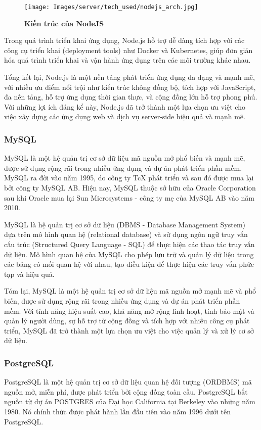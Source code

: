 \begin{figure}[H]
  \centering
  \texttt{[image: Images/server/tech\_used/nodejs\_arch.jpg]}
  \caption[Kiến trúc của NodeJS]{\bfseries \fontsize{12pt}{0pt}
  \selectfont Kiến trúc của NodeJS}
  \label{ble_services} %
\end{figure}
Trong quá trình triển khai ứng dụng, Node.js hỗ trợ dễ dàng tích hợp với các công cụ triển khai (deployment tools) như Docker và Kubernetes, giúp đơn giản hóa quá trình triển khai và vận hành ứng dụng trên các môi trường khác nhau.

Tổng kết lại, Node.js là một nền tảng phát triển ứng dụng đa dạng và mạnh mẽ, với nhiều ưu điểm nổi trội như kiến trúc không đồng bộ, tích hợp với JavaScript, đa nền tảng, hỗ trợ ứng dụng thời gian thực, và cộng đồng lớn hỗ trợ phong phú. Với những lợi ích đáng kể này, Node.js đã trở thành một lựa chọn ưu việt cho việc xây dựng các ứng dụng web và dịch vụ server-side hiệu quả và mạnh mẽ.

\subsubsection{MySQL}
\mbox{}

MySQL là một hệ quản trị cơ sở dữ liệu mã nguồn mở phổ biến và mạnh mẽ, được sử dụng rộng rãi trong nhiều ứng dụng và dự án phát triển phần mềm. MySQL ra đời vào năm 1995, do công ty TcX phát triển và sau đó được mua lại bởi công ty MySQL AB. Hiện nay, MySQL thuộc sở hữu của Oracle Corporation sau khi Oracle mua lại Sun Microsystems - công ty mẹ của MySQL AB vào năm 2010. \cite{mysql_1}

MySQL là hệ quản trị cơ sở dữ liệu (DBMS - Database Management System) dựa trên mô hình quan hệ (relational database) và sử dụng ngôn ngữ truy vấn cấu trúc (Structured Query Language - SQL) để thực hiện các thao tác truy vấn dữ liệu. Mô hình quan hệ của MySQL cho phép lưu trữ và quản lý dữ liệu trong các bảng có mối quan hệ với nhau, tạo điều kiện để thực hiện các truy vấn phức tạp và hiệu quả. \cite{myql_2}

Tóm lại, MySQL là một hệ quản trị cơ sở dữ liệu mã nguồn mở mạnh mẽ và phổ biến, được sử dụng rộng rãi trong nhiều ứng dụng và dự án phát triển phần mềm. Với tính năng hiệu suất cao, khả năng mở rộng linh hoạt, tính bảo mật và quản lý người dùng, sự hỗ trợ từ cộng đồng và tích hợp với nhiều công cụ phát triển, MySQL đã trở thành một lựa chọn ưu việt cho việc quản lý và xử lý cơ sở dữ liệu.

\subsubsection{PostgreSQL}
\mbox{}
PostgreSQL là một hệ quản trị cơ sở dữ liệu quan hệ đối tượng (ORDBMS) mã nguồn mở, miễn phí, được phát triển bởi cộng đồng toàn cầu. PostgreSQL bắt nguồn từ dự án POSTGRES của Đại học California tại Berkeley vào những năm 1980. Nó chính thức được phát hành lần đầu tiên vào năm 1996 dưới tên PostgreSQL.

